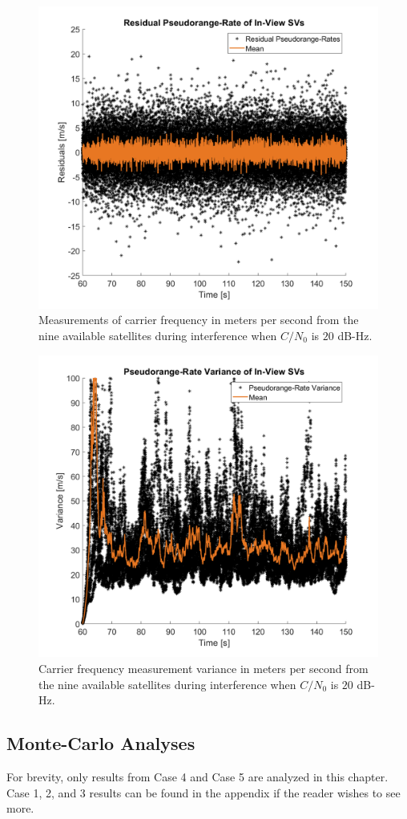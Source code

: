 \begin{figure}[!ht]
    \centering
    \includegraphics[width=0.75\linewidth]{Figures/Results/Scenario1/Case20/carrierFreq.png}
    \caption{Measurements of carrier frequency in meters per second from the nine available satellites during interference when \(C/N_0\) is \(20\) dB-Hz.}\label{fig:carrier20}
\end{figure}

\begin{figure}[!ht]
    \centering
    \includegraphics[width=0.75\linewidth]{Figures/Results/Scenario1/Case20/carrierVariance.png}
    \caption{Carrier frequency measurement variance in meters per second from the nine available satellites during interference when \(C/N_0\) is \(20\) dB-Hz.}\label{fig:carrierVariance20}
\end{figure}
\clearpage
\subsection{\textbf{Monte-Carlo Analyses}}
For brevity, only results from Case 4 and Case 5 are analyzed in this chapter. Case 1, 2, and 3 results can be found in the appendix if the reader wishes to see more.

